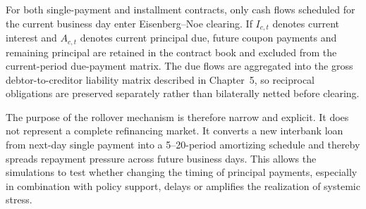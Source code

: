 For both single-payment and installment contracts, only cash flows scheduled
for the current business day enter Eisenberg--Noe clearing. If
\(I_{c,t}\) denotes current interest and \(A_{c,t}\) denotes current
principal due, future coupon payments and remaining principal are retained in the
contract book and excluded from the current-period due-payment matrix.
The due flows are aggregated into the gross debtor-to-creditor liability
matrix described in Chapter~5, so reciprocal obligations are preserved
separately rather than bilaterally netted before clearing.

The purpose of the rollover mechanism is therefore narrow and explicit.
It does not represent a complete refinancing market. It converts a
new interbank loan from next-day single payment into a 5--20-period
amortizing schedule and thereby spreads repayment pressure across future
business days. This
allows the simulations to test whether changing the timing of principal
payments, especially in combination with policy support, delays or
amplifies the realization of systemic stress.
